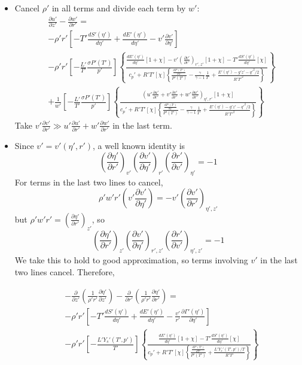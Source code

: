 \documentclass[preprint, prX]{revtex4}
\newcommand{\dd}[2]{\frac{d#1}{d#2}}
\newcommand{\pd}[2]{\frac{\partial#1}{\partial#2}}
\newcommand{\tpd}[3]{\left( \frac{\partial#1}{\partial#2} \right)_{#3}}
\newcommand{\gogmo}{\frac{\gamma}{\gamma-1}}
\begin{document}
\begin{itemize}
\item 
Cancel $\rho'$ in all terms and divide each term by $w'$:
\begin{equation}
\begin{split}
&\pd{u'}{z'} - \pd{w'}{r'} = \\
&-\rho'r'\left[ -T' \dd{S'(\eta')}{\eta'} +\dd{E'(\eta')}{\eta'}- v' \pd{v'}{\eta'} \right] \\
& - \rho' r' \left[ -\frac{L'}{T'}\frac{\sigma P'(T')}{p'} \right] \left\{ \frac{\dd{E'(\eta')}{\eta'}\left[ 1+\chi\right] - v'\tpd{v'}{r'}{r',z'}\left[ 1 + \chi \right] - T' \dd{S'(\eta')}{\eta'}[\chi]}{c_p'+R'T'[\chi] \left\{ \frac{\dd{P'(T')}{T'}}{P'(T')} -\gogmo \frac{1}{T'} + \frac{E'(\eta') - g'z' - q'^2/2}{R'T'^2} \right\} }\right\} \\
&+ \frac{1}{w'} \left[ -\frac{L'}{T'}\frac{\sigma P'(T')}{p'} \right] \left\{ \frac{ \left( u'\pd{u'}{r'} +v'\pd{v'}{r'} + w'\pd{w'}{r'} \right)_{\eta',r'} [1+\chi] }{c_p' + R'T'[\chi] \left\{ \frac{\dd{P'(T')}{T'}}{P'(T')} -\gogmo \frac{1}{T'} + \frac{E'(\eta') - g'z' - q'^2/2}{R'T'^2} \right \} }	\right\}
\end{split}
\end{equation}
Take $v'\pd{v'}{r'} \gg u'\pd{u'}{r'} + w'\pd{w'}{r'}$ in the last term.
\item
Since $v' = v'(\eta',r')$, a well known identity is
\begin{equation}
\tpd{\eta'}{r'}{v'}\tpd{v'}{\eta'}{r'}\tpd{r'}{v'}{\eta'} = -1
\end{equation}
For terms in the last two lines to cancel,
\begin{equation}
\rho'w'r'\left(v'\pd{v'}{\eta'} \right) = -v'\tpd{v'}{r'}{\eta',z'}
\end{equation}
but $\rho'w'r' = \tpd{\eta'}{r'}{z'}$, so
\begin{equation}
\tpd{\eta'}{r'}{z'}\tpd{v'}{\eta'}{r',z'}\tpd{r'}{v'}{\eta',z'} = -1
\end{equation}
We take this to hold to good approximation, so terms involving $v'$ in the last two lines cancel. Therefore,

\begin{equation}
\begin{split}
&-\pd{}{z'}\left( \frac{1}{\rho' r'} \pd{\eta'}{z'}\right) - \pd{}{r'}\left(\frac{1}{\rho'r'} \pd{\eta'}{r'}\right) =\\
&-\rho'r'\left[ -T' \dd{S'(\eta')}{\eta'} +\dd{E'(\eta')}{\eta'}- \frac{v'}{r'} \pd{\Gamma'(\eta')}{\eta'} \right] \\
& - \rho' r' \left[ -\frac{L'Y_s'(T',p')}{T'} \right] \left\{ \frac{\dd{E'(\eta')}{\eta'}\left[ 1+\chi\right]  - T' \dd{S'(\eta')}{\eta'}[\chi]}{c_p'+R'T'[\chi] \left\{ \frac{\dd{P'(T')}{T'}}{P'(T')} +\frac{L'Y_s'(T',p')/T}{R' T'} \right\} }\right\} \\
\end{split}
\end{equation}


\end{itemize}
\end{document}
